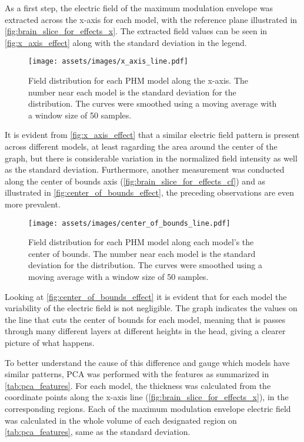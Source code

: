 As a first step, the electric field of the maximum modulation envelope was extracted across the x-axis for each model, with the reference plane illustrated in \autoref{fig:brain_slice_for_effects_x}. The extracted field values can be seen in \autoref{fig:x_axis_effect} along with the standard deviation in the legend.

\begin{figure}[H]
    \centering
    \texttt{[image: assets/images/x\_axis\_line.pdf]}
    \caption{Field distribution for each \gls{PHM} model along the x-axis. The number near each model is the standard deviation for the distribution. The curves were smoothed using a moving average with a window size of 50 samples.}
    \label{fig:x_axis_effect}
\end{figure}

It is evident from \autoref{fig:x_axis_effect} that a similar electric field pattern is present across different models, at least ragarding the area around the center of the graph, but there is considerable variation in the normalized field intensity as well as the standard deviation. Furthermore, another measurement was conducted along the center of bounds axis (\autoref{fig:brain_slice_for_effects_cf}) and as illustrated in \autoref{fig:center_of_bounds_effect}, the preceding observations are even more prevalent.

\begin{figure}[H]
    \centering
    \texttt{[image: assets/images/center\_of\_bounds\_line.pdf]}
    \caption{Field distribution for each \gls{PHM} model along each model's the center of bounds. The number near each model is the standard deviation for the distribution. The curves were smoothed using a moving average with a window size of 50 samples.}
    \label{fig:center_of_bounds_effect}
\end{figure}

Looking at \autoref{fig:center_of_bounds_effect} it is evident that for each model the variability of the electric field is not negligible. The graph indicates the values on the line that cuts the center of bounds for each model, meaning that is passes through many different layers at different heights in the head, giving a clearer picture of what happens. 

To better understand the cause of this difference and gauge which models have similar patterns, \gls{PCA} was performed with the features as summarized in \autoref{tab:pca_features}. For each model, the thickness was calculated from the coordinate points along the x-axis line (\autoref{fig:brain_slice_for_effects_x}), in the corresponding regions. Each of the maximum modulation envelope electric field was calculated in the whole volume of each designated region on \autoref{tab:pca_features}, same as the standard deviation.

